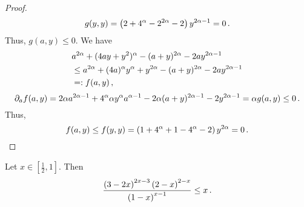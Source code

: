 \begin{proof}
\begin{equation*}
		g(y,y) = \left( 2 + 4^\alpha - 2^{2\alpha} - 2 \right) y^{2\alpha-1} = 0
		\, .
	\end{equation*}
	Thus,  $g(a,y) \leq 0$. We have
	\begin{align*}
		&a^{2\alpha} + (4 a y + y^2)^\alpha - (a+y)^{2\alpha} - 2 a y^{2\alpha-1}
		\\&\leq 
		a^{2\alpha} + (4 a)^\alpha y^\alpha +y^{2\alpha} - (a+y)^{2\alpha} - 2 a y^{2\alpha-1}
		\\&=:f(a,y)
		\, ,
	\end{align*}
	\begin{equation*}
		\partial_a f(a,y) = 2\alpha a^{2\alpha-1} + 4^\alpha \alpha y^\alpha a^{\alpha-1} - 2\alpha(a+y)^{2\alpha-1} - 2y^{2\alpha-1}
		= \alpha g(a,y) \leq 0
		\, .
	\end{equation*}
	Thus,
	\begin{equation*}
		f(a,y) \leq f(y,y) = \left( 1+4^\alpha+1-4^\alpha-2 \right) y^{2\alpha} = 0
		\, .
	\end{equation*}
\end{proof}
%
\begin{lemma}\label{lmm:alphaFraction}
	Let $x\in[\frac12,1 ]$. Then
	\begin{equation*}
		\frac{\left( 3-2x \right)^{2x-3} \left( 2-x \right)^{2-x}}{\left( 1-x \right)^{x-1}} \leq x
		\, .
	\end{equation*}
\end{lemma}
%
